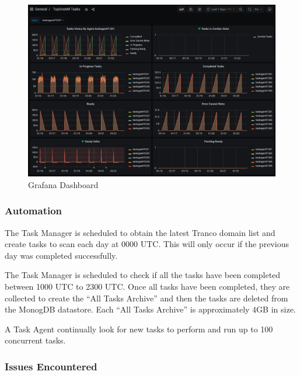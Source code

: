 \documentclass{mscreport}
\begin{document}
\begin{figure}[ht]
	\begin{center}
		\includegraphics[scale=0.48]{../images/Grafana.png} 
		\caption{Grafana Dashboard}
		\label{fig:grafana_screenshot}
	\end{center}
\end{figure}

\noindent
\clearpage

\subsubsection{Automation}

The Task Manager is scheduled to obtain the latest Tranco domain list and create tasks to scan each day at 0000 UTC. This will only occur if the previous day was completed successfully.

\vspace{0.3cm} \noindent
The Task Manager is scheduled to check if all the tasks have been completed between 1000 UTC to 2300 UTC. Once all tasks have been completed, they are collected to create the ``All Tasks Archive'' and then the tasks are deleted from the MonogDB datastore. Each ``All Tasks Archive'' is approximately 4GB in size.

\vspace{0.3cm} \noindent
A Task Agent continually look for new tasks to perform and run up to 100 concurrent tasks.

\subsubsection{Issues Encountered}
\label{subsection:issues_encountered}
\end{document}
